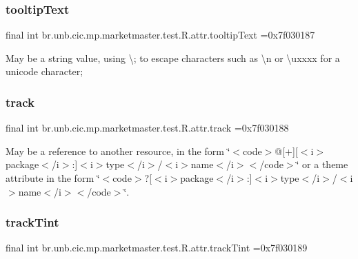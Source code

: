 \subsubsection{\texorpdfstring{tooltip\+Text}{tooltipText}}
{\footnotesize\ttfamily final int br.\+unb.\+cic.\+mp.\+marketmaster.\+test.\+R.\+attr.\+tooltip\+Text =0x7f030187\hspace{0.3cm}{\ttfamily [static]}}

May be a string value, using \textquotesingle{}\textbackslash{};\textquotesingle{} to escape characters such as \textquotesingle{}\textbackslash{}n\textquotesingle{} or \textquotesingle{}\textbackslash{}uxxxx\textquotesingle{} for a unicode character; \mbox{\label{classbr_1_1unb_1_1cic_1_1mp_1_1marketmaster_1_1test_1_1R_1_1attr_a3609096187573f877aa3db0ccca1f7f6}} 
\subsubsection{\texorpdfstring{track}{track}}
{\footnotesize\ttfamily final int br.\+unb.\+cic.\+mp.\+marketmaster.\+test.\+R.\+attr.\+track =0x7f030188\hspace{0.3cm}{\ttfamily [static]}}

May be a reference to another resource, in the form \char`\"{}$<$code$>$@\mbox{[}+\mbox{]}\mbox{[}$<$i$>$package$<$/i$>$\+:\mbox{]}$<$i$>$type$<$/i$>$/$<$i$>$name$<$/i$>$$<$/code$>$\char`\"{} or a theme attribute in the form \char`\"{}$<$code$>$?\mbox{[}$<$i$>$package$<$/i$>$\+:\mbox{]}$<$i$>$type$<$/i$>$/$<$i$>$name$<$/i$>$$<$/code$>$\char`\"{}. \mbox{\label{classbr_1_1unb_1_1cic_1_1mp_1_1marketmaster_1_1test_1_1R_1_1attr_a7d55798edf015ab9223fe42d5b18f945}} 
\subsubsection{\texorpdfstring{track\+Tint}{trackTint}}
{\footnotesize\ttfamily final int br.\+unb.\+cic.\+mp.\+marketmaster.\+test.\+R.\+attr.\+track\+Tint =0x7f030189\hspace{0.3cm}{\ttfamily [static]}}

